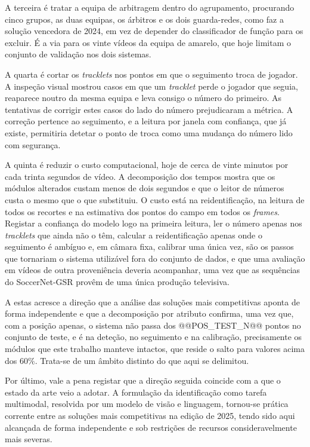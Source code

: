 A terceira é tratar a equipa de arbitragem dentro do agrupamento, procurando cinco grupos, as duas
equipas, os árbitros e os dois guarda-redes, como faz a solução vencedora de 2024, em vez de
depender do classificador de função para os excluir. É a via para os vinte vídeos da equipa de
amarelo, que hoje limitam o conjunto de validação nos dois sistemas.

A quarta é cortar os \emph{tracklets} nos pontos em que o seguimento troca de jogador. A inspeção
visual mostrou casos em que um \emph{tracklet} perde o jogador que seguia, reaparece noutro da mesma
equipa e leva consigo o número do primeiro. As tentativas de corrigir estes casos do lado do número
prejudicaram a métrica. A correção pertence ao seguimento, e a leitura por janela com confiança, que
já existe, permitiria detetar o ponto de troca como uma mudança do número lido com segurança.

A quinta é reduzir o custo computacional, hoje de cerca de vinte minutos por cada trinta segundos de
vídeo. A decomposição dos tempos mostra que os módulos alterados custam menos de dois segundos e que
o leitor de números custa o mesmo que o que substituiu. O custo está na reidentificação, na leitura
de todos os recortes e na estimativa dos pontos do campo em todos os \emph{frames}. Registar a confiança do modelo logo na primeira leitura, ler o número
apenas nos \emph{tracklets} que ainda não o têm, calcular a reidentificação apenas onde o seguimento
é ambíguo e, em câmara fixa, calibrar uma única vez, são os passos que tornariam o sistema
utilizável fora do conjunto de dados, e que uma avaliação em vídeos de outra proveniência deveria
acompanhar, uma vez que as sequências do SoccerNet-GSR provêm de uma única produção televisiva.

A estas acresce a direção que a análise das soluções mais competitivas aponta de forma independente
e que a decomposição por atributo confirma, uma vez que, com a posição apenas, o sistema não passa dos
@@POS_TEST_N@@ pontos no conjunto de teste, e é na deteção, no seguimento e na calibração,
precisamente os módulos que este trabalho manteve intactos, que reside o salto para valores acima
dos $60\%$. Trata-se de um âmbito distinto do que aqui se delimitou.

Por último, vale a pena registar que a direção seguida coincide com a que o estado da arte veio a
adotar. A formulação da identificação como tarefa multimodal, resolvida por um modelo de visão e
linguagem, tornou-se prática corrente entre as soluções mais competitivas na edição de 2025, tendo
sido aqui alcançada de forma independente e sob restrições de recursos consideravelmente mais
severas.
